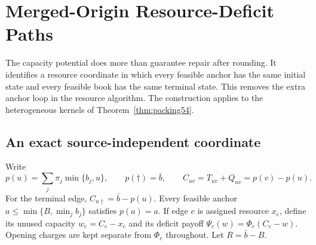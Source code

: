 \documentclass[11pt,letterpaper]{article}
\theoremstyle{definition}\newtheorem{remark}[theorem]{Remark}
\begin{document}
\section{Merged-Origin Resource-Deficit Paths}\label{sec:deficit56}
The capacity potential does more than guarantee repair after rounding. It identifies a resource coordinate in which every feasible anchor has the same initial state and every feasible book has the same terminal state. This removes the extra anchor loop in the resource algorithm. The construction applies to the heterogeneous kernels of Theorem~\ref{thm:packing54}.

\subsection{An exact source-independent coordinate}
Write
\[
 p(u)=\sum_j\pi_j\min\{b_j,u\},\qquad p(\dagger)=\bar b,
 \qquad C_{uv}=T_{uv}+Q_{uv}=p(v)-p(u).
\]
For the terminal edge, $C_{u\dagger}=\bar b-p(u)$. Every feasible anchor $a\leq\min\{B,\min_jb_j\}$ satisfies $p(a)=a$. If edge $e$ is assigned resource $x_e$, define its unused capacity $w_e=C_e-x_e$ and its deficit payoff $\Psi_e(w)=\Phi_e(C_e-w)$. Opening charges are kept separate from $\Phi_e$ throughout. Let $R=\bar b-B$.
\end{document}
